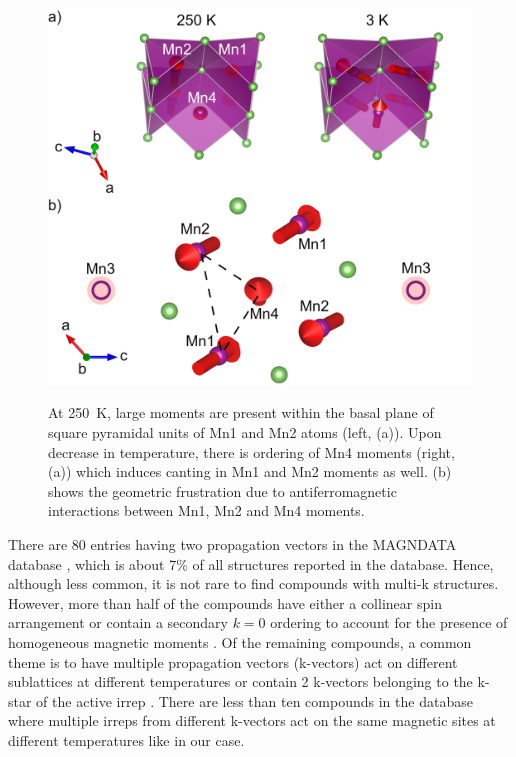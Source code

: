 \documentclass[10pt,doublespacing,edeposit]{uiucthesis2020}
\begin{document}
\begin{mainmatter}
\begin{figure}
\centering\includegraphics[width=0.75\columnwidth]{figures/ch6/spin_canting_dps.png} \\
\caption{At 250~K, large moments are present within the basal plane of square pyramidal units of Mn1 and Mn2 atoms (left, (a)). Upon decrease in temperature, there is ordering of Mn4 moments (right, (a)) which induces canting in Mn1 and Mn2 moments as well. (b) shows the geometric frustration due to antiferromagnetic interactions between Mn1, Mn2 and Mn4 moments.
}
\label{fig:spin_canting}
\end{figure}



There are 80 entries having two propagation vectors in the MAGNDATA database \cite{Gallego2016_1,Gallego2016_2}, which is about 7\% of all structures reported in the database. Hence, although less common, it is not rare to find compounds with multi-k structures. However, more than half of the compounds have either a collinear spin arrangement or contain a secondary $k = 0$ ordering to account for the presence of homogeneous magnetic moments \cite{Klepov2019,Mekata1978}. Of the remaining compounds, a common theme is to have multiple propagation vectors (k-vectors) act on different sublattices at different temperatures \cite{Zhang2019,Yi2015,Jin2013} or contain 2 k-vectors belonging to the k-star of the active irrep \cite{Skanthakumar1991}. There are less than ten compounds in the database where multiple irreps from different k-vectors act on the same magnetic sites at different temperatures like in our case.



\end{mainmatter}
\end{document}
